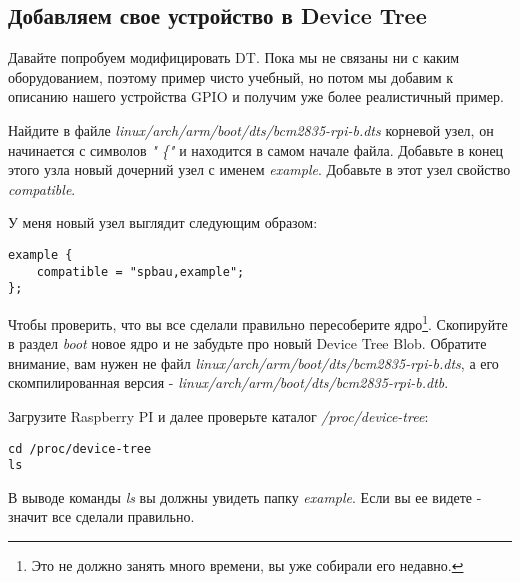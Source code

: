 \subsection{Добавляем свое устройство в Device Tree}

Давайте попробуем модифицировать DT. Пока мы не связаны ни с каким
оборудованием, поэтому пример чисто учебный, но потом мы добавим к описанию
нашего устройства GPIO и получим уже более реалистичный пример.

Найдите в файле \emph{linux/arch/arm/boot/dts/bcm2835-rpi-b.dts} корневой узел,
он начинается с символов \emph{"\/ \{"} и находится в самом начале файла.
Добавьте в конец этого узла новый дочерний узел с именем \emph{example}.
Добавьте в этот узел свойство \emph{compatible}.

У меня новый узел выглядит следующим образом:
\begin{lstlisting}
example {
	compatible = "spbau,example";
};
\end{lstlisting}

Чтобы проверить, что вы все сделали правильно пересоберите ядро\footnote{Это не
должно занять много времени, вы уже собирали его недавно.}. Скопируйте в раздел
\emph{boot} новое ядро и не забудьте про новый Device Tree Blob. Обратите
внимание, вам нужен не файл \emph{linux/arch/arm/boot/dts/bcm2835-rpi-b.dts}, а
его скомпилированная версия - \emph{linux/arch/arm/boot/dts/bcm2835-rpi-b.dtb}.

Загрузите Raspberry PI и далее проверьте каталог \emph{/proc/device-tree}:
\begin{lstlisting}
cd /proc/device-tree
ls
\end{lstlisting}

В выводе команды \emph{ls} вы должны увидеть папку \emph{example}. Если вы ее
видете - значит все сделали правильно.
